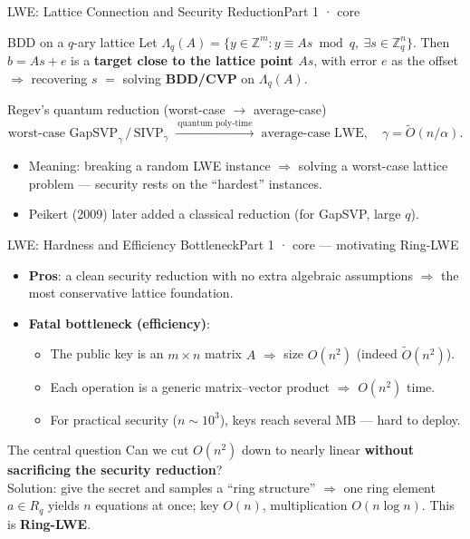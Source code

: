 \documentclass[aspectratio=169, 11pt]{beamer}
\newcommand{\Z}{\mathbb{Z}}
\begin{document}
\begin{frame}{LWE: Lattice Connection and Security Reduction}{Part 1 · core}
  \begin{block}{BDD on a $q$-ary lattice}
    Let $\Lambda_q(A)=\{y\in\Z^m: y\equiv As \bmod q,\ \exists s\in\Z_q^n\}$.
    Then $b=As+e$ is a \textbf{target close to the lattice point $As$}, with error $e$ as the offset
    $\Rightarrow$ recovering $s$ $=$ solving \textbf{BDD/CVP} on $\Lambda_q(A)$.
  \end{block}
  \begin{block}{Regev's quantum reduction (worst-case $\to$ average-case)}
    \[
      \text{worst-case GapSVP}_\gamma \,/\, \text{SIVP}_\gamma
      \;\xrightarrow{\ \text{quantum poly-time}\ }\;
      \text{average-case LWE},\quad \gamma=\tilde{O}(n/\alpha).
    \]
  \end{block}
  \begin{itemize}\small
    \item Meaning: \alert{breaking a random LWE instance} $\Rightarrow$ \alert{solving a worst-case lattice problem} ---
      security rests on the ``hardest'' instances.
    \item Peikert (2009) later added a classical reduction (for GapSVP, large $q$).
  \end{itemize}
\end{frame}

\begin{frame}{LWE: Hardness and Efficiency Bottleneck}{Part 1 · core --- motivating Ring-LWE}
  \begin{itemize}\small
    \item \textbf{Pros}: a clean security reduction with no extra algebraic assumptions $\Rightarrow$ the most conservative lattice foundation.
    \item \textbf{Fatal bottleneck (efficiency)}:
      \begin{itemize}
        \item The public key is an $m\times n$ matrix $A$ $\Rightarrow$ size $O(n^2)$ (indeed $\tilde O(n^2)$).
        \item Each operation is a generic matrix--vector product $\Rightarrow$ $O(n^2)$ time.
        \item For practical security ($n\sim10^3$), keys reach several MB --- hard to deploy.
      \end{itemize}
  \end{itemize}
  \begin{block}{The central question}
    Can we cut $O(n^2)$ down to nearly linear \textbf{without sacrificing the security reduction}?\\
    \alert{Solution: give the secret and samples a ``ring structure''} $\Rightarrow$ one ring element $a\in R_q$
    yields $n$ equations at once; key $O(n)$, multiplication $O(n\log n)$.\quad
    This is \textbf{Ring-LWE}.
  \end{block}
\end{frame}
\end{document}
